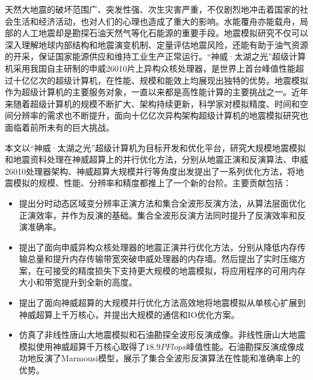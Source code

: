 \begin{cabstract}
天然大地震的破坏范围广、突发性强、次生灾害严重，不仅剧烈地冲击着国家的社会生活和经济活动，也对人们的心理也造成了重大的影响。水能覆舟亦能载舟，局部的人工地震却是勘探石油天然气等化石能源的重要手段。地震模拟研究不仅可以深入理解地球内部结构和地震演变机制、定量评估地震风险，还能有助于油气资源的开采，保证国家能源供应和维持工业生产正常运行。“神威·太湖之光”超级计算机采用我国自主研制的申威26010片上异构众核处理器，是世界上首台峰值性能超过十亿亿次的超级计算机，在性能、规模和能效上均展现出独特的优势。地震模拟作为超级计算机的主要服务对象，一直以来都是高性能计算的主要挑战之一。近年来随着超级计算机的规模不断扩大、架构持续更新，科学家对模拟精度、时间和空间分辨率的需求也不断提升，面向十亿亿次异构架构超级计算机的地震模拟研究也面临着前所未有的巨大挑战。


本文以“神威·太湖之光”超级计算机为目标开发和优化平台，研究大规模地震模拟和地震资料处理在神威超算上的并行优化方法，分别从地震正演和反演算法、申威26010处理器架构、神威超算大规模并行等角度出发提出了一系列优化方法，将地震模拟的规模、性能、分辨率和精度都推上了一个新的台阶。主要贡献包括：
  \begin{itemize}
    \item 提出分时动态区域变分辨率正演方法和集合全波形反演方法，从算法层面优化正演效率，并作为反演的基础。集合全波形反演方法同时提升了反演效率和反演准确率。
    
    \item 提出了面向申威异构众核处理器的地震正演并行优化方法，分别从降低内存传输总量和提升内存传输带宽突破申威处理器的内存墙。然后提出了实时压缩方案，在可接受的精度损失下支持更大规模的地震模拟，将应用程序的可用内存大小和带宽提升到全新的高度。
    
    \item 提出了面向神威超算的大规模并行优化方法高效地将地震模拟从单核心扩展到神威超算上千万核心，并提出大规模的通信和IO优化方案。

    \item 仿真了非线性唐山大地震模拟和石油勘探全波形反演成像。非线性唐山大地震模拟使用神威超算千万核心取得了$18.9PFlops$峰值性能。石油勘探反演成像成功地反演了Marmousi模型，展示了集合全波形反演算法在性能和准确率上的优势。
  \end{itemize}

\end{cabstract}


